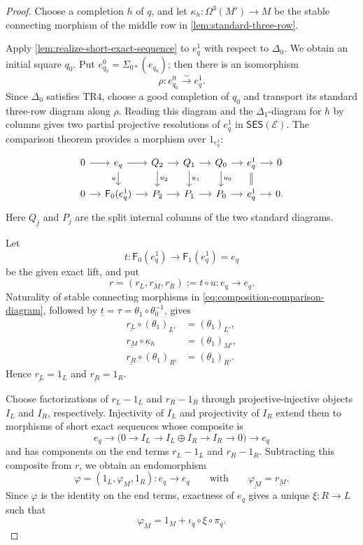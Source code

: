 \documentclass[a4paper,11pt,reqno]{amsart}
\theoremstyle{definition}
\theoremstyle{plain}
\numberwithin{equation}{section}
\begin{document}
\begin{proof}
Choose a completion \(h\) of \(q\), and let
\(\kappa_h:\Omega^3(M')\to M\) be the stable connecting morphism of the
middle row in \cref{lem:standard-three-row}.

Apply \cref{lem:realize-short-exact-sequence} to \(e_q^1\) with respect to
\(\Delta_0\).  We obtain an initial square \(q_0\).  Put
\(e_{q_0}^0=\Sigma_{0*}(e_{q_0})\); then there is an isomorphism
\[
 \rho:e_{q_0}^0\xrightarrow{\sim}e_q^1.
\]
Since \(\Delta_0\) satisfies \(\mathrm{TR4}\), choose a good completion of
\(q_0\) and transport its standard three-row diagram along \(\rho\).  Reading
this diagram and the \(\Delta_1\)-diagram for \(h\) by columns gives two
partial projective resolutions of \(e_q^1\) in
\(\mathsf{SES}(\mathcal E)\).  The
comparison theorem provides a morphism over \(1_{e_q^1}\):
\begin{equation}
\label{eq:composition-comparison-diagram}
\begin{tikzcd}[column sep=1.15em,row sep=1.3em]
0\arrow[r]&e_q\arrow[r]\arrow[d,"u"']&
Q_2\arrow[r]\arrow[d,"u_2"]&Q_1\arrow[r]\arrow[d,"u_1"]&
Q_0\arrow[r]\arrow[d,"u_0"]&e_q^1\arrow[r]\arrow[d,equal]&0\\
0\arrow[r]&\mathsf F_0(e_q^1)\arrow[r]&
P_2\arrow[r]&P_1\arrow[r]&P_0\arrow[r]&e_q^1\arrow[r]&0.
\end{tikzcd}
\end{equation}
Here \(Q_j\) and \(P_j\) are the split internal columns of the two standard
diagrams.

Let
\[
 t:\mathsf F_0(e_q^1)\longrightarrow
   \mathsf F_1(e_q^1)=e_q
\]
be the given exact lift, and put
\[
 r=(r_L,r_M,r_R):=t\circ u:e_q\longrightarrow e_q.
\]
Naturality of stable connecting morphisms in
\eqref{eq:composition-comparison-diagram}, followed by
\(\underline t=\tau=\theta_1\circ\theta_0^{-1}\), gives
\begin{equation}
\label{eq:exact-lift-closes-comparison}
\begin{aligned}
 \underline{r_L}\circ(\theta_1)_{L'}&=(\theta_1)_{L'},\\
 \underline{r_M}\circ\kappa_h&=(\theta_1)_{M'},\\
 \underline{r_R}\circ(\theta_1)_{R'}&=(\theta_1)_{R'}.
\end{aligned}
\end{equation}
Hence \(\underline{r_L}=1_L\) and \(\underline{r_R}=1_R\).

Choose factorizations of \(r_L-1_L\) and \(r_R-1_R\) through
projective-injective objects \(I_L\) and \(I_R\), respectively.  Injectivity
of \(I_L\) and projectivity of \(I_R\) extend them to morphisms
of short exact sequences whose composite is
\[
 e_q\longrightarrow
 \bigl(0\longrightarrow I_L\longrightarrow I_L\oplus I_R
 \longrightarrow I_R\longrightarrow0\bigr)
 \longrightarrow e_q
\]
and has components on the end terms \(r_L-1_L\) and \(r_R-1_R\).  Subtracting
this composite from \(r\), we obtain an endomorphism
\[
 \varphi=(1_L,\varphi_M,1_R):e_q\longrightarrow e_q
 \qquad\text{with}\qquad
 \underline{\varphi_M}=\underline{r_M}.
\]
Since \(\varphi\) is the identity on the end terms, exactness of \(e_q\)
gives a unique \(\xi:R\to L\) such that
\[
 \varphi_M=1_M+\iota_q\circ\xi\circ\pi_q.
\]


\end{proof}
\end{document}
